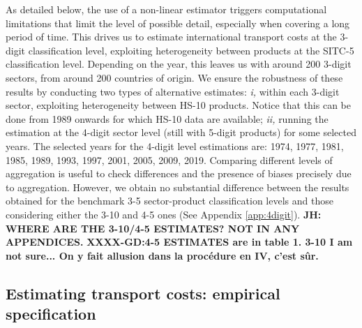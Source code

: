\documentclass[a4paper,11pt]{article}
\begin{document}
As detailed below, the use of a non-linear estimator triggers computational limitations that limit the level of possible detail, especially when covering a long period of time. This drives us to estimate international transport costs at the 3-digit classification level, exploiting heterogeneity between products at the SITC-5 classification level. Depending on the year, this leaves us with around 200 3-digit sectors, from around 200 countries of origin. We ensure the robustness of these results by conducting two types of alternative estimates: \textit{i,} within each 3-digit sector, exploiting heterogeneity between HS-10 products. Notice that this can be done from 1989 onwards for which HS-10 data are available; \textit{ii,} running the estimation at the 4-digit sector level (still with 5-digit products) for some selected years. The selected years for the 4-digit level estimations are: 1974, 1977, 1981, 1985, 1989, 1993, 1997, 2001, 2005, 2009, 2019. Comparing different levels of aggregation is useful to check differences and the presence of biases precisely due to aggregation. However, we obtain no substantial difference between the results obtained for the benchmark 3-5 sector-product classification levels and those considering either the 3-10 and 4-5 ones (See Appendix \ref{app:4digit}). \textbf{JH: WHERE ARE THE 3-10/4-5 ESTIMATES? NOT IN ANY APPENDICES.}
 \textbf{XXXX-GD:4-5 ESTIMATES are in table 1. 3-10 I am not sure... On y fait allusion dans la procédure en IV, c’est sûr.}



\subsection{Estimating transport costs: empirical specification}
\end{document}
